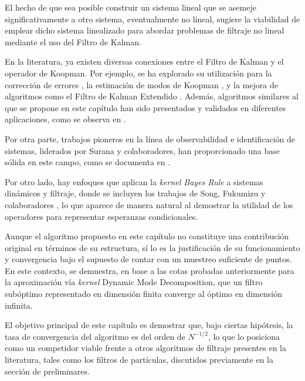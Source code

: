 El hecho de que sea posible construir un sistema lineal que se asemeje significativamente a otro sistema, eventualmente no lineal, sugiere la viabilidad de emplear dicho sistema linealizado para abordar problemas de filtraje no lineal mediante el uso del Filtro de Kalman. 

En la literatura, ya existen diversas conexiones entre el Filtro de Kalman y el operador de Koopman. Por ejemplo, se ha explorado su utilización para la corrección de errores \cite{Jiang2022CorrectingFilters}, la estimación de modos de Koopman \cite{Liu2024EstimateFilter}, y la mejora de algoritmos como el Filtro de Kalman Extendido \cite{Ramadan2024ExtendedControl}. Además, algoritmos similares al que se propone en este capítulo han sido presentados y validados en diferentes aplicaciones, como se observa en \cite{Wang2022KoopmanSystem, Wang2023Innovation-saturatedOutliers, Netto2018RobustEstimation, Syed2021Koopman-basedXFEL, HuangData-DrivenFlight}. 

Por otra parte, trabajos pioneros en la línea de observabilidad e identificación de sistemas, liderados por Surana y colaboradores, han proporcionado una base sólida en este campo, como se documenta en \cite{Surana2016KoopmanSystems, Surana2016LinearFramework}.

Por otro lado, hay enfoques que aplican la \textit{kernel Bayes Rule} a sistemas dinámicos y filtraje, donde se incluyen los trabajos de Song, Fukumizu y colaboradores \cite{Fukumizu2004DimensionalitySpaces, Fukumizu2013KernelKernels, Fukumizu2015NonparametricEmbedding, Song2009HilbertSystems, Song2013KernelModels}, lo que aparece de manera natural al demostrar la utilidad de los operadores para representar esperanzas condicionales.

Aunque el algoritmo propuesto en este capítulo no constituye una contribución original en términos de su estructura, sí lo es la justificación de su funcionamiento y convergencia bajo el supuesto de contar con un muestreo suficiente de puntos. En este contexto, se demuestra, en base a las cotas probadas anteriormente para la aproximación vía \textit{kernel} Dynamic Mode Decomposition, que un filtro subóptimo representado en dimensión finita converge al óptimo en dimensión infinita. 

El objetivo principal de este capítulo es demostrar que, bajo ciertas hipótesis, la tasa de convergencia del algoritmo es del orden de $N^{-1/2}$, lo que lo posiciona como un competidor viable frente a otros algoritmos de filtraje presentes en la literatura, tales como los filtros de partículas, discutidos previamente en la sección de preliminares.

